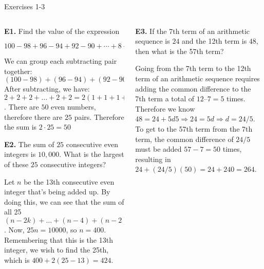 \documentclass[9pt,aspectratio=169]{beamer}
\begin{document}
\begin{frame}{Exercises 1-3}
  \begin{columns}[T]
    \begin{column}{0.5\textwidth}
      \begin{problem}
        \textbf{E1.} Find the value of the expression
        
        $100-98+96-94+92-90+\cdots+8-6+4-2.$
      \end{problem}
      We can group each subtracting pair together:\[(100-98)+(96-94)+(92-90)+ \ldots +(8-6)+(4-2).\]After subtracting, we have: $2+2+2+\ldots+2+2=2(1+1+1+\ldots+1+1)$. There are $50$ even numbers, therefore there are $25$ pairs. Therefore the sum is $2 \cdot 25=\boxed{50}$

      \begin{problem}
        \textbf{E2.} The sum of $25$ consecutive even integers is $10,000$. What is the largest of these $25$ consecutive integers?
      \end{problem}
      Let $n$ be the 13th consecutive even integer that's being added up. By doing this, we can see that the sum of all 25 $(n-2k)+\dots+(n-4)+(n-2)+(n)+(n+2)+(n+4)+ \dots +(n+2k)=25n$. Now, $25n=10000$, so $n=400$. Remembering that this is the 13th integer, we wish to find the 25th, which is $400+2(25-13)=\boxed{424}$.
    \end{column}
    \begin{column}{0.5\textwidth}
      \begin{problem}
        \textbf{E3.} If the 7th term of an arithmetic sequence is $24$ and the 12th term is $48$, then what is
        the 57th term?
      \end{problem}
      Going from the 7th term to the 12th term of an arithmetic sequence requires adding the
      common difference to the 7th term a total of $12 – 7 = 5$ times. Therefore we know
      $48 = 24 + 5d5 \Rightarrow 24 = 5d \Rightarrow d = 24/5$. To get to the 57th term from the 7th term, the common
      difference of $24/5$ must be added $57 - 7 = 50$ times, resulting in $24 + (24/5)(50) = 24 + 240 = \boxed{264}$.

      
    \end{column}
  \end{columns}
\end{frame}
\end{document}
